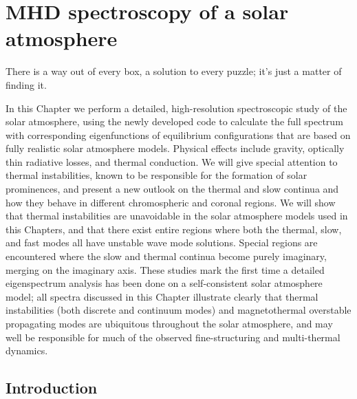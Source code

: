 \chapter{MHD spectroscopy of a solar atmosphere} \label{ch: solar_atmosphere}

\begin{chapterquote}
  There is a way out of every box, a solution to every puzzle; it's just a matter of finding it.
\end{chapterquote}


In this Chapter we perform a detailed, high-resolution spectroscopic study of the solar atmosphere, using the newly developed {\legolas} code to calculate the full spectrum with corresponding eigenfunctions of equilibrium configurations that are based on fully realistic solar atmosphere models. Physical effects include gravity, optically thin radiative losses, and thermal conduction. We will give special attention to thermal instabilities, known to be responsible for the formation of solar prominences, and present a new outlook on the thermal and slow continua and how they behave in different chromospheric and coronal regions. We will show that thermal instabilities are unavoidable in the solar atmosphere models used in this Chapters, and that there exist entire regions where both the thermal, slow, and fast modes all have unstable wave mode solutions. Special regions are encountered where the slow and thermal continua become purely imaginary, merging on the imaginary axis. These studies mark the first time a detailed eigenspectrum analysis has been done on a self-consistent solar atmosphere model; all spectra discussed in this Chapter illustrate clearly that thermal instabilities (both discrete and continuum modes) and magnetothermal overstable propagating modes are ubiquitous throughout the solar atmosphere, and may well be responsible for much of the observed fine-structuring and multi-thermal dynamics.

\section{Introduction}


\cleardoublepage
